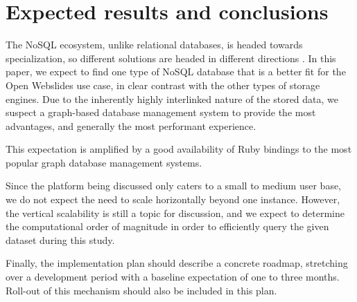 \documentclass[fleqn,10pt]{voorstel}
\begin{document}
\section{Expected results and conclusions}
\label{sec:expected_results_and_conclusions}

The NoSQL ecosystem, unlike relational databases, is headed towards specialization, so different solutions are headed in different directions \autocite{Maroo2013}. In this paper, we expect to find one type of NoSQL database that is a better fit for the Open Webslides use case, in clear contrast with the other types of storage engines. Due to the inherently highly interlinked nature of the stored data, we suspect a graph-based database management system to provide the most advantages, and generally the most performant experience.

This expectation is amplified by a good availability of Ruby bindings to the most popular graph database management systems.

Since the platform being discussed only caters to a small to medium user base, we do not expect the need to scale horizontally beyond one instance. However, the vertical scalability is still a topic for discussion, and we expect to determine the computational order of magnitude in order to efficiently query the given dataset during this study.

Finally, the implementation plan should describe a concrete roadmap, stretching over a development period with a baseline expectation of one to three months. Roll-out of this mechanism should also be included in this plan.


\nocite{KaurRani2013}

\printbibliography[heading=bibintoc]
\end{document}
